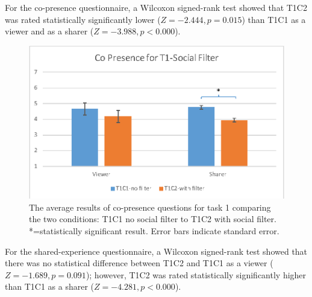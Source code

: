 For the co-presence questionnaire, a Wilcoxon signed-rank test showed that T1C2 was rated statistically significantly lower ($Z=-2.444, p=0.015$) than T1C1 as a viewer and as a sharer ($Z=-3.988, p<0.000$).


\begin{figure}[h]
    \begin{center}
    \includegraphics[width=.8\linewidth]{images/54-hiding-frontier18/images-10.eps}
    \caption{The average results of co-presence questions for task 1 comparing the two conditions: T1C1 no social filter to T1C2 with social filter. *=statistically significant result. Error bars indicate standard error.}
    \label{fig:frontier18:result-copresence-filter}
    \end{center}
\end{figure}


For the shared-experience questionnaire, a Wilcoxon signed-rank test showed that there was no statistical difference between T1C2 and T1C1 as a viewer ($Z=-1.689, p=0.091$); however, T1C2 was rated statistically significantly higher than T1C1 as a sharer ($Z=-4.281, p<0.000$).

